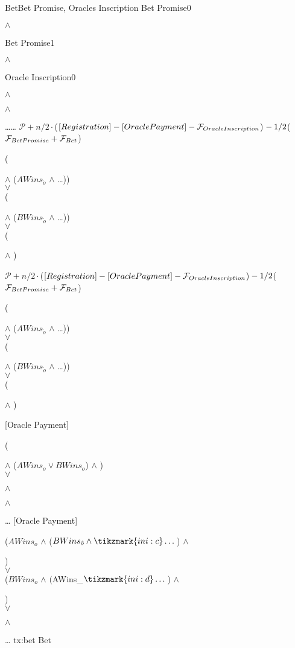 \transaction
    {Bet}{Bet Promise, Oracles Inscription}
    {Bet Promise}{0}{\signature{A} $\wedge$ \signature{B}}
    {Bet Promise}{1}{\signature{A} $\wedge$ \signature{B}}
    {Oracle Inscription}{0}
        {\signature{A} $\wedge$ \signature{B} $\wedge$ \signature{O}}
        {\ldots}{\ldots}{}
    \stopinputs
    {$\mathcal{P} + n/2 \cdot $($[Registration] \\
            - [Oracle Payment] \\
            - \mathcal{F}_{Oracle Inscription}$)$ \\
            - 1/2 $($\mathcal{F}_{Bet Promise} + \mathcal{F}_{Bet}$)}
        {(\signature{A} $\wedge$ ($AWins_{\tilde{o}}$ $\wedge$ \ldots {})) \\
                          $\vee$ \\
         (\signature{B} $\wedge$ ($BWins_{\tilde{o}}$ $\wedge$ \ldots {})) \\
                                    $\vee$ \\
         (\signature{A} $\wedge$ )}
    {$\mathcal{P} + n/2 \cdot $($[Registration] \\
            - [Oracle Payment] \\
            - \mathcal{F}_{Oracle Inscription}$)$ \\
            - 1/2 $($\mathcal{F}_{Bet Promise} + \mathcal{F}_{Bet}$)}
        {(\signature{A} $\wedge$ ($AWins_{\tilde{o}}$ $\wedge$ \ldots {})) \\
                          $\vee$ \\
         (\signature{B} $\wedge$ ($BWins_{\tilde{o}}$ $\wedge$ \ldots {})) \\
                                    $\vee$ \\
         (\signature{B} $\wedge$ )}
    {[Oracle Payment]}{(\signature{o} $\wedge$ ($AWins_o \vee BWins_o$) %
                       $\wedge$ ) \\
                       $\vee$  \\
                       \signature{A} $\wedge$ \signature{B} $\wedge$ %
                       }
    {\ldots}{}
    {[Oracle Payment]}{($AWins_o$ $\wedge$ ($BWins_{\hat{o}} \wedge %
                        \tikzmark{ini:c}\dots$) $\wedge$ \signature{B}) \\
                       $\vee$ \\
                       ($BWins_o$ $\wedge$ $($AWins_{}$ %
                        $\wedge$ \tikzmark{ini:d} \dots$) $\wedge$ \signature{A}) \\
                       $\vee$ \\
                        \signature{o} $\wedge$ }
    {\ldots}{}
    \stopoutputs
    {tx:bet}
    {Bet}

